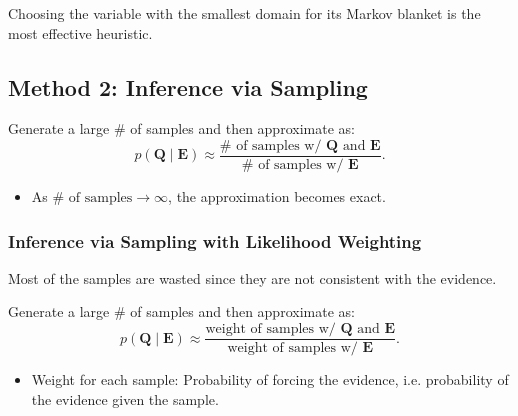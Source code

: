 \begin{warning}
    Choosing the variable with the smallest domain for its Markov blanket is the most effective heuristic.
\end{warning}
\newpage

\subsection{Method 2: Inference via Sampling}
\begin{definition}
    Generate a large \# of samples and then approximate as:
    \[
    p(\mathbf{Q} \mid \mathbf{E}) \approx \frac{\# \text{ of samples w/ } \mathbf{Q} \text{ and } \mathbf{E}}{\# \text{ of samples w/ } \mathbf{E}}.
    \]
    \begin{itemize}
        \item As $\# \text{ of samples} \to \infty$, the approximation becomes exact.
    \end{itemize}
\end{definition}

\subsubsection{Inference via Sampling with Likelihood Weighting}
\begin{motivation}
    Most of the samples are wasted since they are not consistent with the evidence.
\end{motivation}

\begin{definition}
    Generate a large \# of samples and then approximate as:
    \[
    p(\mathbf{Q} \mid \mathbf{E}) \approx \frac{\text{weight of samples w/ } \mathbf{Q} \text{ and } \mathbf{E}}{\text{weight of samples w/ } \mathbf{E}}.
    \]
    \begin{itemize}
        \item Weight for each sample: Probability of forcing the evidence, i.e. probability of the evidence given the sample.
    \end{itemize}
\end{definition}
\newpage

